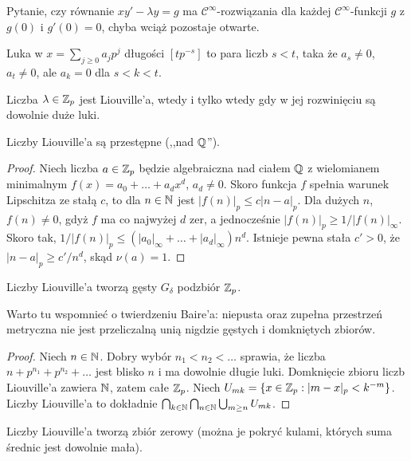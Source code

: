 Pytanie, czy równanie $xy' - \lambda y = g$ ma $\mathcal C^\infty$-rozwiązania dla każdej $\mathcal C^\infty$-funkcji $g$ z $g(0)$ i $g'(0) = 0$, chyba wciąż pozostaje otwarte.

\begin{definicja}
	Luka w $x = \sum_{j \ge 0} a_jp^j$ długości $[tp^{-s}]$ to para liczb $s < t$, taka że $a_s \neq 0$, $a_t \neq 0$, ale $a_k = 0$ dla $s < k < t$.
\end{definicja}

\begin{fakt}
	Liczba $\lambda \in \mathbb Z_p$ jest Liouville'a, wtedy i tylko wtedy gdy w jej rozwinięciu są dowolnie duże luki.
\end{fakt}

\begin{fakt}
	Liczby Liouville'a są przestępne (,,nad $\mathbb Q$'').
\end{fakt}

\begin{proof}
	Niech liczba $a \in \mathbb Z_p$ będzie algebraiczna nad ciałem $\mathbb Q$ z wielomianem minimalnym $f(x) = a_0 + \ldots + a_d x^d$, $a_d \neq 0$.
	Skoro funkcja $f$ spełnia warunek Lipschitza ze stałą $c$, to dla $n \in \mathbb N$ jest $|f(n)|_p \le c|n-a|_p$.
	Dla dużych $n$, $f(n) \neq 0$, gdyż $f$ ma co najwyżej $d$ zer, a jednocześnie $|f(n)|_p \ge 1/|f(n)|_\infty$.
	Skoro tak, $1/ |f(n)|_p \le (|a_0|_\infty + \ldots + |a_d|_\infty) n^d$.
	Istnieje pewna stała $c' > 0$, że $|n - a|_p \ge c' / n^{d}$, skąd $\nu(a) = 1$.
\end{proof}

\begin{fakt}
	Liczby Liouville'a tworzą gęsty $G_\delta$ podzbiór $\mathbb Z_p$.
\end{fakt}

Warto tu wspomnieć o twierdzeniu Baire'a: niepusta oraz zupełna przestrzeń metryczna nie jest przeliczalną unią nigdzie gęstych i domkniętych zbiorów.

\begin{proof}
	Niech $n \in \mathbb N$.
	Dobry wybór $n_1 < n_2 < \ldots$ sprawia, że liczba $n + p^{n_1} + p^{n_2} + \ldots$ jest blisko $n$ i ma dowolnie długie luki.
	Domknięcie zbioru liczb Liouville'a zawiera $\mathbb N$, zatem całe $\mathbb Z_p$.
	Niech $U_{mk} = \{x \in \mathbb Z_p : |m-x|_p < k^{-m}\}$.
	Liczby Liouville'a to dokładnie $\bigcap_{k \in \mathbb N} \bigcap_{n \in \mathbb N} \bigcup_{m \ge n} U_{mk}$.
\end{proof}

\begin{fakt}
	Liczby Liouville'a tworzą zbiór zerowy (można je pokryć kulami, których suma średnic jest dowolnie mała).
\end{fakt}

